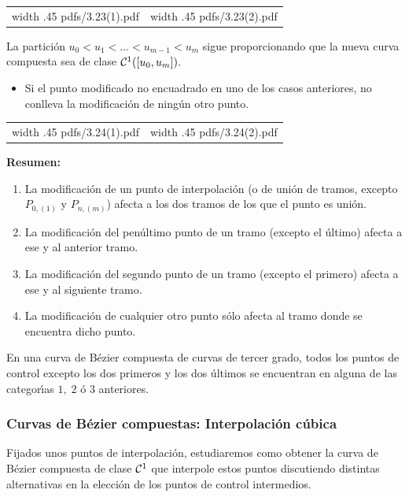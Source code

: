 \documentclass[twoside]{report}
\newcommand{\colocapdf}[2]{\quad\pdfimage width #2 {pdfs/#1.pdf}}
\begin{document}
\begin{center}
\begin{tabular}{cc}
\colocapdf{3.23(1)}{.45\textwidth} &
\colocapdf{3.23(2)}{.45\textwidth}
\end{tabular}
\end{center}

La partici\'{o}n $u_0<u_1<\ldots<u_{m-1}<u_m$ sigue proporcionando que la nueva curva compuesta sea de clase ${\cal C}^1([u_0,u_m]).$

\begin{itemize}
\item Si el punto modificado no encuadrado en uno de los casos anteriores, no conlleva la modificaci\'{o}n de ning\'{u}n otro punto.
\end{itemize}

\begin{center}
\begin{tabular}{cc}
\colocapdf{3.24(1)}{.45\textwidth} &
\colocapdf{3.24(2)}{.45\textwidth}
\end{tabular}
\end{center}

{\bf Resumen:}

\begin{enumerate}
\item La modificaci\'{o}n de un punto de interpolaci\'{o}n (o de uni\'{o}n de tramos, excepto $P_{0,(1)}$  y $P_{n, (m)}$) afecta a los dos tramos de los que el punto es uni\'{o}n.
\item La modificaci\'{o}n del pen\'{u}ltimo punto de un tramo (excepto el \'{u}ltimo) afecta a ese y al anterior tramo.
\item La modificaci\'{o}n del segundo punto de un tramo (excepto el primero) afecta a ese y al siguiente tramo.
\item La modificaci\'{o}n de cualquier otro punto s\'{o}lo afecta al tramo donde se encuentra dicho punto.
\end{enumerate}

En una curva de B\'{e}zier compuesta de curvas de tercer grado, todos los puntos de control excepto los dos primeros y los dos \'{u}ltimos se encuentran en alguna de las categor\'{\i}as $1,\;2$ \'{o} $3$ anteriores.

\subsubsection{Curvas de B\'{e}zier compuestas: Interpolaci\'{o}n c\'{u}bica}

Fijados unos puntos de interpolaci\'{o}n, estudiaremos como obtener la curva de B\'{e}zier compuesta de clase ${\cal C}^1$ que interpole estos puntos discutiendo distintas alternativas en la elecci\'{o}n de los puntos de control intermedios.
\end{document}
